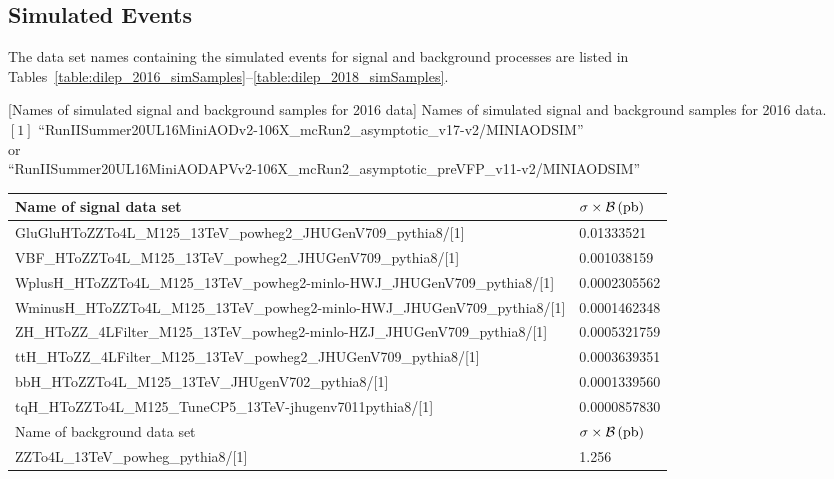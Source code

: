 \subsection{Simulated Events}
\label{sec:sim_samples_dilep}
The data set names containing the simulated events for signal and background processes are listed in Tables~\ref{table:dilep_2016_simSamples}--\ref{table:dilep_2018_simSamples}. %
\begin{table}[h]
    \small
        [Names of simulated signal and background samples for 2016 data] %
        {Names of simulated signal and background samples for 2016 data. \\ %
        $[1]$ ``RunIISummer20UL16MiniAODv2-106X\_mcRun2\_asymptotic\_v17-v2/MINIAODSIM''
        \\
        or
        \\
        ``RunIISummer20UL16MiniAODAPVv2-106X\_mcRun2\_asymptotic\_preVFP\_v11-v2/MINIAODSIM''}
	\begin{tabular}{|ll|}
		\hline      
        Name of signal data set & $\sigma \times \mathcal{B}\,(\text{pb})$ \\
        \hline
		GluGluHToZZTo4L\_M125\_13TeV\_powheg2\_JHUGenV709\_pythia8/[1]	&	0.01333521	\\
		VBF\_HToZZTo4L\_M125\_13TeV\_powheg2\_JHUGenV709\_pythia8/[1]	&	0.001038159	\\
		WplusH\_HToZZTo4L\_M125\_13TeV\_powheg2-minlo-HWJ\_JHUGenV709\_pythia8/[1]	&	0.0002305562	\\
		WminusH\_HToZZTo4L\_M125\_13TeV\_powheg2-minlo-HWJ\_JHUGenV709\_pythia8/[1]	&	0.0001462348	\\
		ZH\_HToZZ\_4LFilter\_M125\_13TeV\_powheg2-minlo-HZJ\_JHUGenV709\_pythia8/[1]	&	0.0005321759	\\
		ttH\_HToZZ\_4LFilter\_M125\_13TeV\_powheg2\_JHUGenV709\_pythia8/[1]	&	0.0003639351	\\
		bbH\_HToZZTo4L\_M125\_13TeV\_JHUgenV702\_pythia8/[1]	&	0.0001339560	\\
		tqH\_HToZZTo4L\_M125\_TuneCP5\_13TeV-jhugenv7011\-pythia8/[1]	&	0.0000857830	\\
		\hline	
		\hline	
        Name of background data set & $\sigma \times \mathcal{B}\,(\text{pb})$ \\
		\hline	
		ZZTo4L\_13TeV\_powheg\_pythia8/[1]	&	1.256	\\

\end{tabular}
\end{table}
